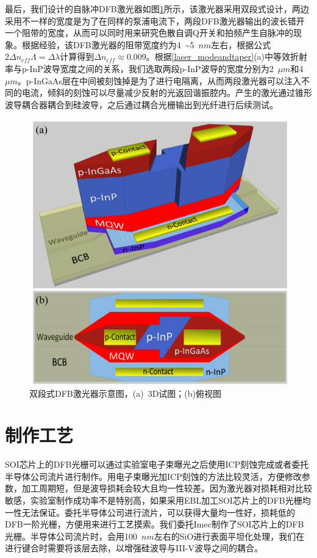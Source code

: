 最后，我们设计的自脉冲DFB激光器如图\ref{laser_structure}所示，该激光器采用双段式设计，两边采用不一样的宽度是为了在同样的泵浦电流下，两段DFB激光器输出的波长错开一个阻带的宽度，从而可以同时用来研究色散自调Q开关和拍频产生自脉冲的现象。根据经验，该DFB激光器的阻带宽度约为4~\~{}5~$nm$左右，根据公式$2\Delta n_{eff}\Lambda = \Delta\lambda$计算得到$\Delta n_{eff}\approx 0.009$。根据\ref{laser_modeandtaper}(a)中等效折射率与p-InP波导宽度之间的关系，我们选取两段p-InP波导的宽度分别为2~$\mu m$和4~$\mu m$。p-InGaAs层在中间被刻蚀掉是为了进行电隔离，从而两段激光器可以注入不同的电流，倾斜的刻蚀可以尽量减少反射的光返回谐振腔内。产生的激光通过锥形波导耦合器耦合到硅波导，之后通过耦合光栅输出到光纤进行后续测试。

\begin{figure}[htb]
	\centering
	\includegraphics[width=12cm]{./Pictures/laser_structure.jpg}
	\captionsetup{justification=centering}
	\caption{双段式DFB激光器示意图，(a)~3D试图；(b)俯视图}
	\label{laser_structure}
\end{figure}

\section{制作工艺}

SOI芯片上的DFB光栅可以通过实验室电子束曝光之后使用ICP刻蚀完成或者委托半导体公司流片进行制作。用电子束曝光加ICP刻蚀的方法比较灵活，方便修改参数，加工周期短，但是波导损耗会较大且均一性较差。因为激光器对损耗相对比较敏感，实验室制作成功率不是特别高，如果采用EBL加工SOI芯片上的DFB光栅均一性无法保证。委托半导体公司进行流片，可以获得大量均一性好，损耗低的DFB一阶光栅，方便用来进行工艺摸索。我们委托Imec\cite{Imec}制作了SOI芯片上的DFB光栅。半导体公司流片时，会用100~$nm$左右的SiO进行表面平坦化处理，我们在进行键合时需要将该层去除，以增强硅波导与III-V波导之间的耦合。

